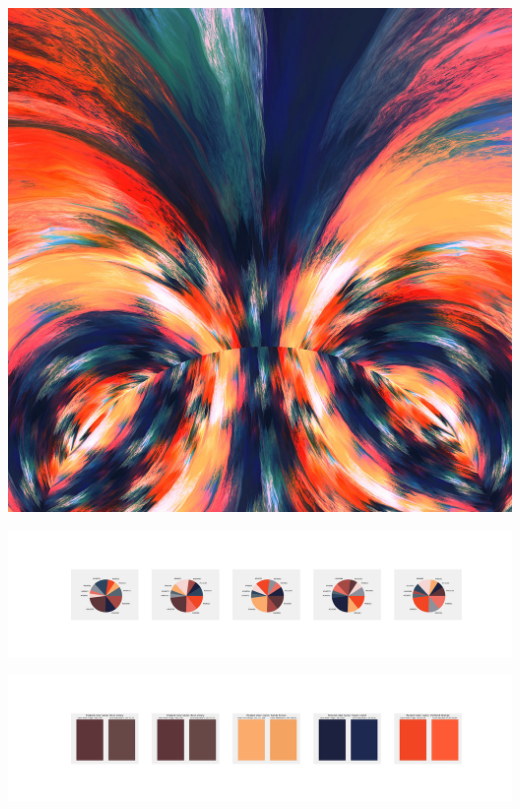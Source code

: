 \documentclass[11pt]{article}
\begin{document}
\begin{landscape}
    \begin{center}
    \includegraphics[width=\textwidth]{./nbimg/file (284).jpg}
    \end{center}

    \begin{center}
    \includegraphics[width=250mm]{./nbimg/pie-205.jpg}
    \end{center}

    \begin{center}
    \includegraphics[width=250mm]{./nbimg/peak-205.jpg}
    \end{center}
    


\end{landscape}
\end{document}
